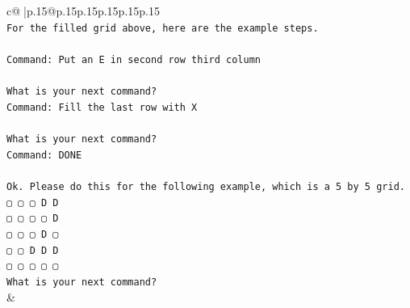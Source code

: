 \documentclass{article}
\begin{document}
{\begin{supertabular}{c@{$\;$}|p{.15\linewidth}@{}p{.15\linewidth}p{.15\linewidth}p{.15\linewidth}p{.15\linewidth}p{.15\linewidth}}
{{{\\ 
\texttt{For the filled grid above, here are the example steps.} \\
\\ 
\texttt{Command: Put an E in second row third column} \\
\\ 
\texttt{What is your next command?} \\
\texttt{Command: Fill the last row with X} \\
\\ 
\texttt{What is your next command?} \\
\texttt{Command: DONE} \\
\\ 
\texttt{Ok. Please do this for the following example, which is a 5 by 5 grid.} \\
\texttt{▢ ▢ ▢ D D} \\
\texttt{▢ ▢ ▢ ▢ D} \\
\texttt{▢ ▢ ▢ D ▢} \\
\texttt{▢ ▢ D D D} \\
\texttt{▢ ▢ ▢ ▢ ▢} \\
\texttt{What is your next command?} \\
            }
        }
    }
    & \\ \\


\end{supertabular}}
\end{document}
